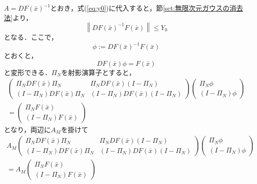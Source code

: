 $A=DF(\bar{x})^{-1}$とおき，式(\ref{eq:y0})に代入すると，節\ref{sct:無限次元ガウスの消去法}より，
\begin{equation}
  \left \| DF(\bar{x})^{-1} F(\bar{x}) \right \| \leq Y_0
\end{equation}
となる．ここで，
\begin{equation*}
  \phi:=DF(\bar{x})^{-1} F(\bar{x})
\end{equation*}
とおくと，
\begin{equation*}
  DF(\bar{x}) \phi = F(\bar{x})
\end{equation*}
と変形できる．$\Pi_N$を射影演算子とすると，
\begin{equation}
    \begin{split}
    \begin{pmatrix}
      \Pi_N DF(\bar{x}) \Pi_N & \Pi_N DF(\bar{x}) (I-\Pi_N) \\
      (I-\Pi_N) DF(\bar{x}) \Pi_N & (I-\Pi_N) DF(\bar{x}) (I-\Pi_N)
    \end{pmatrix}
    \begin{pmatrix}
      \Pi_N \phi \\
      (I-\Pi_N) \phi
    \end{pmatrix}
    \\=
    \begin{pmatrix}
      \Pi_N F(\bar{x}) \\
      (I - \Pi_N) F(\bar{x})
    \end{pmatrix}
  \end{split}
\end{equation}
となり，両辺に$A_M$を掛けて
\begin{equation}
  \label{eq:y0-1}
  \begin{split}
  A_M
    \begin{pmatrix}
      \Pi_N DF(\bar{x}) \Pi_N & \Pi_N DF(\bar{x}) (I-\Pi_N) \\
      (I-\Pi_N) DF(\bar{x}) \Pi_N & (I-\Pi_N) DF(\bar{x}) (I-\Pi_N)
    \end{pmatrix}
    \begin{pmatrix}
      \Pi_N \phi \\
      (I-\Pi_N) \phi
    \end{pmatrix}
    \\=A_M
    \begin{pmatrix}
      \Pi_N F(\bar{x}) \\
      (I - \Pi_N) F(\bar{x})
    \end{pmatrix}
  \end{split}
\end{equation}
